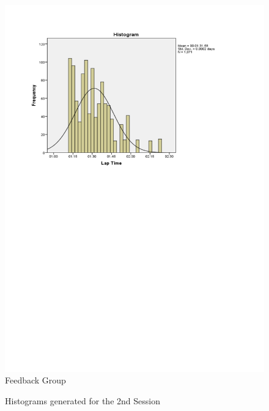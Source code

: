 \begin{figure}
\begin{minipage}{0.45\textwidth}
		\includegraphics[width=\textwidth]{charts/2-1}
		Feedback Group
	\end{minipage}
	\caption{Histograms generated for the 2nd Session}
	\label{fig:hist-2}
\end{figure}

